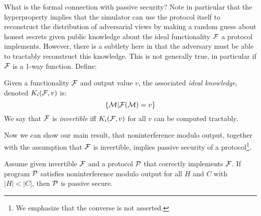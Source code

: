 What is the formal connection with passive security? Note in
particular that the hyperproperty implies that the simulator can use
the protocol itself to reconstruct the distribution of adversarial
views by making a random guess about honest secrets given public
knowledge about the ideal functionality $\mathcal{F}$ a protocol
implements. However, there is a subtlety here in that the adversary
must be able to tractably reconstruct this knowledge. This is not
generally true, in particular if $\mathcal{F}$ is a 1-way
function. Define:
\begin{definition}
  Given a functionality $\mathcal{F}$ and output value $v$, the associated
  \emph{ideal knowledge}, denoted $K_i(\mathcal{F},v)$ is:
  $$
  \{ \mathcal{M} | \mathcal{F}(\mathcal{M}) = v \}
  $$
  We say that $\mathcal{F}$ is \emph{invertible} iff $K_i(\mathcal{F}, v)$ for all
  $v$ can be computed tractably.
\end{definition}
Now we can show our main result, that noninterference modulo output,
together with the assumption that $\mathcal{F}$ is invertible, implies
passive security of a protocol\footnote{We emphasize that the converse
is not asserted.}. 
\begin{theorem}
  Assume given invertible $\mathcal{F}$ and a protocol $\mathcal{P}$ that
  correctly implements $\mathcal{F}$.  If program $\mathcal{P}$ satisfies
  noninterference modulo output for all $H$ and $C$ with $|H| < |C|$,
  then $\mathcal{P}$ is passive secure.
\end{theorem}

